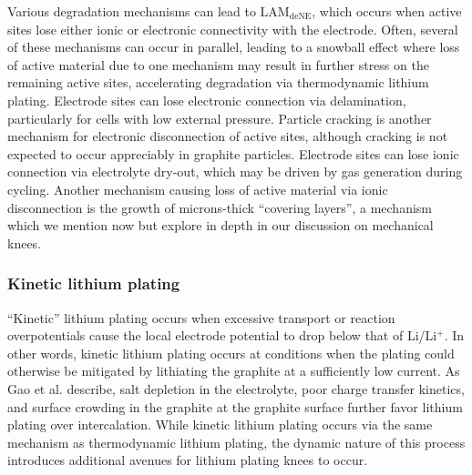 \documentclass[journal=jpclcd,manuscript=article]{achemso}
\begin{document}
Various degradation mechanisms can lead to $\mathrm{LAM_{deNE}}$, which occurs when active sites lose either ionic or electronic connectivity with the electrode.
Often, several of these mechanisms can occur in parallel, leading to a snowball effect where loss of active material due to one mechanism may result in further stress on the remaining active sites, accelerating degradation via thermodynamic lithium plating.
Electrode sites can lose electronic connection via delamination\cite{liu_aging_2010, cannarella_stress_2014, somerville_effect_2016, willenberg_high-precision_2020}, particularly for cells with low external pressure\cite{cannarella_stress_2014}. Particle cracking is another mechanism for electronic disconnection of active sites, although cracking is not expected to occur appreciably in graphite particles.\cite{takahashi_examination_2015}
Electrode sites can lose ionic connection via electrolyte dry-out, which may be driven by gas generation during cycling.\cite{mao_calendar_2017, kupper_end--life_2018}
Another mechanism causing loss of active material via ionic disconnection is the growth of microns-thick ``covering layers'', a mechanism which we mention now but explore in depth in our discussion on mechanical knees.

\subsubsection{Kinetic lithium plating}

``Kinetic'' lithium plating occurs when excessive transport or reaction overpotentials cause the local electrode potential to drop below that of Li/Li$\mathrm{^+}$.
In other words, kinetic lithium plating occurs at conditions when the plating could otherwise be mitigated by lithiating the graphite at a sufficiently low current. As Gao et al.\cite{gao_interplay_2021} describe, salt depletion in the electrolyte, poor charge transfer kinetics, and surface crowding in the graphite at the graphite surface further favor lithium plating over intercalation. While kinetic lithium plating occurs via the same mechanism as thermodynamic lithium plating, the dynamic nature of this process introduces additional avenues for lithium plating knees to occur.
\end{document}
